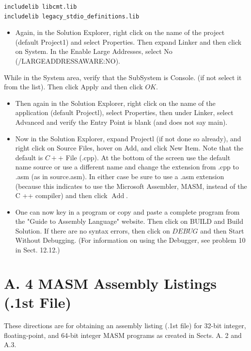 \documentclass[10pt]{book}
\begin{document}
\begin{verbatim}
includelib libcmt.lib
includelib legacy_stdio_definitions.lib
\end{verbatim}

\begin{itemize}
  \item Again, in the Solution Explorer, right click on the name of the project (default Project1) and select Properties. Then expand Linker and then click on System. In the Enable Large Addresses, select No (/LARGEADDRESSAWARE:NO).
\end{itemize}

While in the System area, verify that the SubSystem is Console. (if not select it from the list). Then click Apply and then click $O K$.

\begin{itemize}
  \item Then again in the Solution Explorer, right click on the name of the application (default Projectl), select Properties, then under Linker, select Advanced and verify the Entry Point is blank (and does not say main).
  \item Now in the Solution Explorer, expand Projectl (if not done so already), and right click on Source Files, hover on Add, and click New Item. Note that the default is $C++$ File (.cpp). At the bottom of the screen use the default name source or use a different name and change the extension from .cpp to .asm (as in source.asm). In either case be sure to use a .asm extension (because this indicates to use the Microsoft Assembler, MASM, instead of the C ++ compiler) and then click $\operatorname{Add}$.
  \item One can now key in a program or copy and paste a complete program from the "Guide to Assembly Language" website. Then click on BUILD and Build Solution. If there are no syntax errors, then click on $D E B U G$ and then Start Without Debugging. (For information on using the Debugger, see problem 10 in Sect. 12.12.)
\end{itemize}

\section*{A. 4 MASM Assembly Listings (.1st File)}
These directions are for obtaining an assembly listing (.1st file) for 32-bit integer, floating-point, and 64-bit integer MASM programs as created in Sects. A. 2 and A.3.
\end{document}
